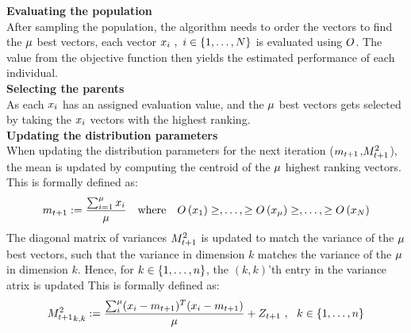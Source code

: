 \textbf{Evaluating the population}\\
After sampling the population, the algorithm needs to order the vectors to find the $\mu$ best vectors, each vector $x_{i}\ ,\ i \in \{1, \dots, N\}$ is evaluated using $O$. 
The value from the objective function then yields 
the estimated performance of each individual.
\\

\textbf{Selecting the parents}\\
As each $x_{i}$ has an assigned evaluation value, and the 
$\mu$ best vectors gets selected by 
taking the $x_{i}$ vectors with the highest ranking.
\\

\textbf{Updating the distribution parameters}\\
When updating the distribution parameters for the next iteration
($m_{t + 1}$,$M^2_{t + 1}$), 
the mean is updated by computing the centroid of the 
$\mu$ highest ranking vectors. This is formally defined as:
\begin{align*}
\mean_{\generation +1}:=\frac{\sum_{i=1}^{\offspringNumber} \individual_{i}}{\offspringNumber}
\ \ \ 
\text{where}
\ \ \ 
\fitnessFunction \left( \individual_{1} \right) \geq, \dots, 
\geq \fitnessFunction \left( \individual_{\offspringNumber} \right) \geq, 
\dots, \geq \fitnessFunction \left( \individual_{\populationSize} \right)
\end{align*}
The diagonal matrix of variances $M^2_{t + 1}$ is updated 
to match the variance of the $\mu$ best
vectors, such that the variance in dimension $k$ 
matches the variance of the $\mu$
in dimension $k$. Hence, for $k \in \{ 1,\dots,n \}$,
the $(k,k)$'th entry in the variance atrix is 
updated 
This is formally defined as:
\begin{align*}
{\varianceMatrix^2_{\generation +1}}_{k,k}:=\frac{\sum_{i}^{\offspringNumber}
(\individual_{i} - \mean_{\generation +1})^T(\individual_{i} - \mean_{\generation +1})}{\offspringNumber} + \noise_{\generation + 1}\ ,\ \ k \in \{ 1,\dots,\dimensions \}
\end{align*}
\\
